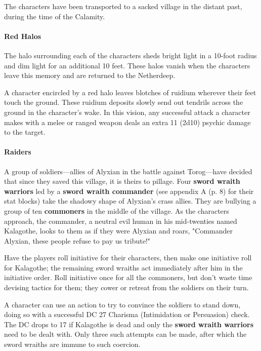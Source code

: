\documentclass[letterpaper, 11pt, bg=full, twocolumn]{dndbook}
\begin{document}
The characters have been transported to a sacked village in the distant past, during the time of the Calamity.

\paragraph{Red Halos}

The halo surrounding each of the characters sheds bright light in a 10-foot radius and dim light for an additional 10 feet. These halos vanish when the characters leave this memory and are returned to the Netherdeep.

A character encircled by a red halo leaves blotches of ruidium wherever their feet touch the ground. These ruidium deposits slowly send out tendrils across the ground in the character's wake. In this vision, any successful attack a character makes with a melee or ranged weapon deals an extra 11 (2d10) psychic damage to the target.

\paragraph{Raiders}

A group of soldiers---allies of Alyxian in the battle against Torog---have decided that since they saved this village, it is theirs to pillage. Four \textbf{sword wraith warriors} led by a \textbf{sword wraith commander} (see appendix A (p. 8) for their stat blocks) take the shadowy shape of Alyxian's crass allies. They are bullying a group of ten \textbf{commoners} in the middle of the village. As the characters approach, the commander, a neutral evil human in his mid-twenties named Kalagothe, looks to them as if they were Alyxian and roars, "Commander Alyxian, these people refuse to pay us tribute!"

Have the players roll initiative for their characters, then make one initiative roll for Kalagothe; the remaining sword wraiths act immediately after him in the initiative order. Roll initiative once for all the commoners, but don't waste time devising tactics for them; they cower or retreat from the soldiers on their turn.

A character can use an action to try to convince the soldiers to stand down, doing so with a successful DC 27 Charisma (Intimidation or Persuasion) check. The DC drops to 17 if Kalagothe is dead and only the \textbf{sword wraith warriors} need to be dealt with. Only three such attempts can be made, after which the sword wraiths are immune to such coercion.
\end{document}
